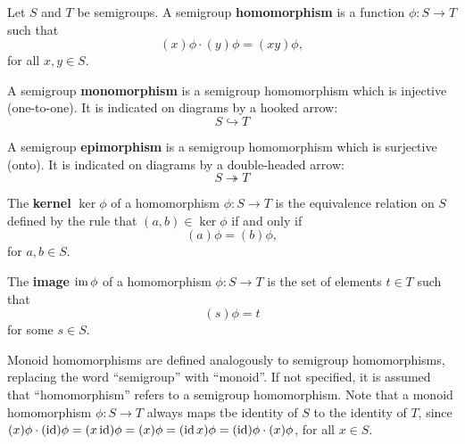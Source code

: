 \begin{definition}
  \label{def:homomorphism}
  Let $S$ and $T$ be semigroups.  A semigroup \textbf{homomorphism} is a
  function $\phi: S \to T$ such that
  $$(x)\phi \cdot (y)\phi = (xy)\phi,$$
  for all $x, y \in S$.
\end{definition}

\begin{definition}
  \label{def:monomorphism}
  A semigroup \textbf{monomorphism} is a semigroup homomorphism which is
  injective (one-to-one).  It is indicated on diagrams by a hooked arrow:
  $$S \hookrightarrow T$$
\end{definition}

\begin{definition}
  \label{def:epimorphism}
  A semigroup \textbf{epimorphism} is a semigroup homomorphism which is
  surjective (onto).  It is indicated on diagrams by a double-headed arrow:
  $$S \twoheadrightarrow T$$
\end{definition}

\begin{definition}
  \label{def:kernel}
  The \textbf{kernel} $\ker\phi$ of a homomorphism $\phi:S \to T$ is the
  equivalence relation on $S$ defined by the rule that $(a,b) \in \ker\phi$ if
  and only if
  $$(a)\phi = (b)\phi,$$
  for $a, b \in S$.
\end{definition}

\begin{definition}
  \label{def:image}
  The \textbf{image} $\operatorname{im}\phi$ of a homomorphism $\phi:S \to T$ is the set of
  elements $t \in T$ such that
  $$(s)\phi = t$$
  for some $s \in S$.
\end{definition}

Monoid homomorphisms are defined analogously to semigroup homomorphisms,
replacing the word ``semigroup'' with ``monoid''.  If not specified, it is
assumed that ``homomorphism'' refers to a semigroup homomorphism.  Note that a
monoid homomorphism $\phi:S \to T$ always maps tbe identity of $S$ to the
identity of $T$, since
$(x)\phi \cdot (\operatorname{id})\phi
= (x \operatorname{id})\phi
= (x)\phi
= (\operatorname{id} x)\phi
= (\operatorname{id})\phi \cdot (x)\phi$,
for all $x \in S$.

